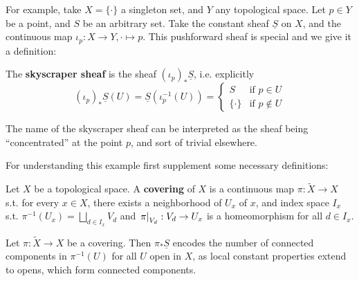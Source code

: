 \documentclass{article}
\begin{document}
For example, take $X = \{ \cdot \}$ a singleton set, and $Y$ any topological space. Let $p \in Y$ be a point, and $S$ be an arbitrary set. Take the constant sheaf $\underline{S}$ on $X$, and the continuous map $\iota_p: X \to Y, \cdot \mapsto p$. This pushforward sheaf is special and we give it a definition:

\begin{definition}
    The \textbf{skyscraper sheaf} is the sheaf $(\iota_p)_{\ast} \underline{S}$, i.e. explicitly
    \[
        (\iota_p)_{\ast} \underline{S}(U) = \underline{S}(\iota_p^{-1}(U)) =
        \begin{cases}
            S & \text{if $p \in U$} \\
            \{ \cdot \} & \text{if $p \notin U$}
        \end{cases}
    \]
\end{definition}

\textstart
The name of the skyscraper sheaf can be interpreted as the sheaf being ``concentrated'' at the point $p$, and sort of trivial elsewhere.

\begin{example}
    For understanding this example first supplement some necessary definitions:

    \begin{definition}[Covering]
        Let $X$ be a topological space. A \textbf{covering} of $X$ is a continuous map $\pi: \widetilde{X} \to X$ s.t. for every $x \in X$, there exists a neighborhood of $U_x$ of $x$, and index space $I_x$ s.t. $\pi^{-1} (U_x) = \bigsqcup_{d \in I_x} V_d$ and $\left.\pi\right|_{V_d}: V_d \to U_x$ is a homeomorphism for all $d \in I_x$.
    \end{definition}

    Let $\pi: \widetilde{X} \to X$ be a covering. Then $\pi_{\ast} \underline{S}$ encodes the number of connected components in $\pi^{-1}(U)$ for all $U$ open in $X$, as local constant properties extend to opens, which form connected components.
\end{example}
\end{document}
